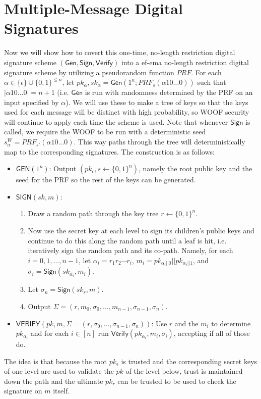 \documentclass[12pt]{tufte-book}
\newcommand{\Gen}{\mathsf{Gen}}
\newcommand{\Sign}{\mathsf{Sign}}
\newcommand{\Verify}{\mathsf{Verify}}
\begin{document}
\section{Multiple-Message Digital Signatures} 

Now we will show how to covert this one-time, no-length restriction digital signature scheme $(\Gen, \Sign, \Verify)$ into a ef-ema no-length restriction digital signature scheme by utilizing a pseudorandom function $PRF$. 
For each $\alpha \in \{\epsilon\} \cup \{0,1\}^{\leq n}$, let $pk_\alpha, sk_\alpha = \Gen(1^n; PRF_s(\alpha 10 \ldots 0))$ such that $|\alpha 10 \ldots 0| = n+1$ (i.e. $\Gen$ is run with randomness determined by the PRF on an input specified by $\alpha$). 
We will use these to make a tree of keys so that the keys used for each message will be distinct with high probability, so WOOF security will continue to apply each time the scheme is used. 
Note that whenever $\Sign$ is called, we require the WOOF to be run with a deterministic seed $s_{\alpha}^W = PRF_{s'}(\alpha 10 \ldots 0)$. 
This way paths through the tree will deterministically map to the corresponding signatures. 
The construction is as follows: 
\begin{itemize}
    \item $\mathsf{GEN}(1^n)$: Output $(pk_\epsilon, s \leftarrow \{0,1\}^n)$, namely the root public key and the seed for the PRF so the rest of the keys can be generated. 

    \item $\mathsf{SIGN}(sk, m)$: 
    \begin{enumerate}
        \item Draw a random path through the key tree $r \leftarrow \{0,1\}^n$. 

        \item Now use the secret key at each level to sign its children's public keys and continue to do this along the random path until a leaf is hit, i.e. iteratively sign the random path and its co-path. 
        Namely, for each $i = 0, 1, \ldots, n-1$, let $\alpha_i = r_1 r_2 \cdots r_i$, $m_i = pk_{\alpha_i || 0} || pk_{\alpha_i || 1}$, and $\sigma_i = \Sign(sk_{\alpha_i}, m_i)$. 

        \item Let $\sigma_n = \Sign(sk_r, m)$. 

        \item Output $\Sigma = (r, m_0, \sigma_0, \ldots, m_{n-1}, \sigma_{n-1}, \sigma_n)$. 
    \end{enumerate} 

    \item $\mathsf{VERIFY}(pk, m, \Sigma = (r, \sigma_0, \ldots, \sigma_{n-1}, \sigma_n))$: Use $r$ and the $m_i$ to determine $pk_{\alpha_i}$ and for each $i \in [n]$ run $\Verify(pk_{\alpha_i}, m_i, \sigma_i)$, accepting if all of those do. 
\end{itemize}
The idea is that because the root $pk_{\epsilon}$ is trusted and the corresponding secret keys of one level are used to validate the $pk$ of the level below, trust is maintained down the path and the ultimate $pk_r$ can be trusted to be used to check the signature on $m$ itself. 
\end{document}
